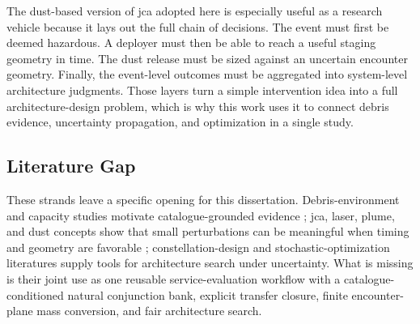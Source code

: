 The dust-based version of \gls{jca} adopted here is especially useful as a research vehicle because it lays out the full chain of decisions. The event must first be deemed hazardous. A deployer must then be able to reach a useful staging geometry in time. The dust release must be sized against an uncertain encounter geometry. Finally, the event-level outcomes must be aggregated into system-level architecture judgments. Those layers turn a simple intervention idea into a full architecture-design problem, which is why this work uses it to connect debris evidence, uncertainty propagation, and optimization in a single study.

\subsection{Literature Gap}
These strands leave a specific opening for this dissertation. Debris-environment and capacity studies motivate catalogue-grounded evidence \cite{ESAEnvironment2025,Matney2025ORDEM4,Muciaccia2024LEOCapacity}; \gls{jca}, laser, plume, and dust concepts show that small perturbations can be meaningful when timing and geometry are favorable \cite{JARRY2019185,CORDELLI2022612,Phipps2011lodr,Bonnal2020}; constellation-design and stochastic-optimization literatures supply tools for architecture search under uncertainty. What is missing is their joint use as one reusable service-evaluation workflow with a catalogue-conditioned natural conjunction bank, explicit transfer closure, finite encounter-plane mass conversion, and fair architecture search.

